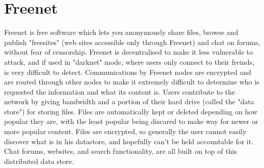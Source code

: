 \section{Freenet}
Freenet is free software which lets you anonymously share files, browse and publish "freesites" (web sites accessible only through Freenet) and chat on forums, without fear of censorship. Freenet is decentralised to make it less vulnerable to attack, and if used in "darknet" mode, where users only connect to their freinds, is very difficult to detect.
\newline
Communications by Freenet nodes are encrypted and are routed through other nodes to make it extremely difficult to determine who is requested the information and what its content is.
\newline
Users contribute to the network by giving bandwidth and a portion of their hard drive (called the "data store") for storing files. Files are automatically kept or deleted depending on how popular they are, with the least popular being discared to make way for newer or more popular content. Files are encrypted, so generally the user cannot easily discover what is in his datastore, and hopefully can't be held accountable for it. Chat forums, websites, and search functionality, are all built on top of this distributed data store.\cite{freenet}
\newpage
